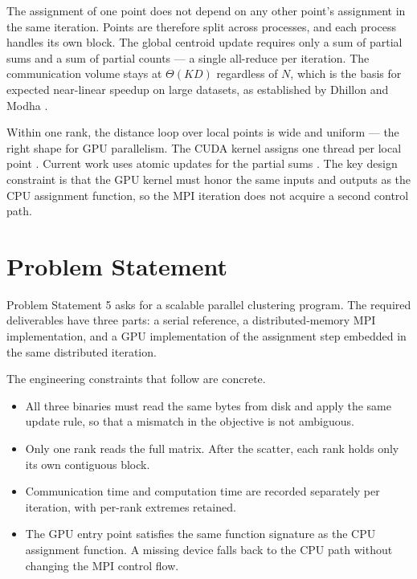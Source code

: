 \documentclass[12pt,a4paper]{article}
\begin{document}
The assignment of one point does not depend on any other point's assignment in the same iteration. Points are therefore split across processes, and each process handles its own block. The global centroid update requires only a sum of partial sums and a sum of partial counts — a single all-reduce per iteration. The communication volume stays at $\Theta(KD)$ regardless of $N$, which is the basis for expected near-linear speedup on large datasets, as established by Dhillon and Modha \cite{dhillon2000}.

Within one rank, the distance loop over local points is wide and uniform — the right shape for GPU parallelism. The CUDA kernel assigns one thread per local point \cite{farivar2008}. Current work uses atomic updates for the partial sums \cite{li2013}. The key design constraint is that the GPU kernel must honor the same inputs and outputs as the CPU assignment function, so the MPI iteration does not acquire a second control path.

\section{Problem Statement}
\label{sec:problem}

Problem Statement 5 asks for a scalable parallel clustering program. The required deliverables have three parts: a serial reference, a distributed-memory MPI implementation, and a GPU implementation of the assignment step embedded in the same distributed iteration.

The engineering constraints that follow are concrete.

\begin{itemize}
  \item All three binaries must read the same bytes from disk and apply the same update rule, so that a mismatch in the objective is not ambiguous.
  \item Only one rank reads the full matrix. After the scatter, each rank holds only its own contiguous block.
  \item Communication time and computation time are recorded separately per iteration, with per-rank extremes retained.
  \item The GPU entry point satisfies the same function signature as the CPU assignment function. A missing device falls back to the CPU path without changing the MPI control flow.
\end{itemize}
\end{document}
